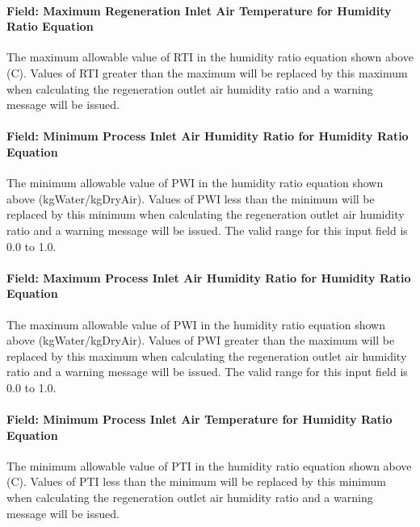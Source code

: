 \paragraph{Field: Maximum Regeneration Inlet Air Temperature for Humidity Ratio Equation}\label{field-maximum-regeneration-inlet-air-temperature-for-humidity-ratio-equation}

The maximum allowable value of RTI in the humidity ratio equation shown above (C). Values of RTI greater than the maximum will be replaced by this maximum when calculating the regeneration outlet air humidity ratio and a warning message will be issued.

\paragraph{Field: Minimum Process Inlet Air Humidity Ratio for Humidity Ratio Equation}\label{field-minimum-process-inlet-air-humidity-ratio-for-humidity-ratio-equation}

The minimum allowable value of PWI in the humidity ratio equation shown above (kgWater/kgDryAir). Values of PWI less than the minimum will be replaced by this minimum when calculating the regeneration outlet air humidity ratio and a warning message will be issued. The valid range for this input field is 0.0 to 1.0.

\paragraph{Field: Maximum Process Inlet Air Humidity Ratio for Humidity Ratio Equation}\label{field-maximum-process-inlet-air-humidity-ratio-for-humidity-ratio-equation}

The maximum allowable value of PWI in the humidity ratio equation shown above (kgWater/kgDryAir). Values of PWI greater than the maximum will be replaced by this maximum when calculating the regeneration outlet air humidity ratio and a warning message will be issued. The valid range for this input field is 0.0 to 1.0.

\paragraph{Field: Minimum Process Inlet Air Temperature for Humidity Ratio Equation}\label{field-minimum-process-inlet-air-temperature-for-humidity-ratio-equation}

The minimum allowable value of PTI in the humidity ratio equation shown above (C). Values of PTI less than the minimum will be replaced by this minimum when calculating the regeneration outlet air humidity ratio and a warning message will be issued.

